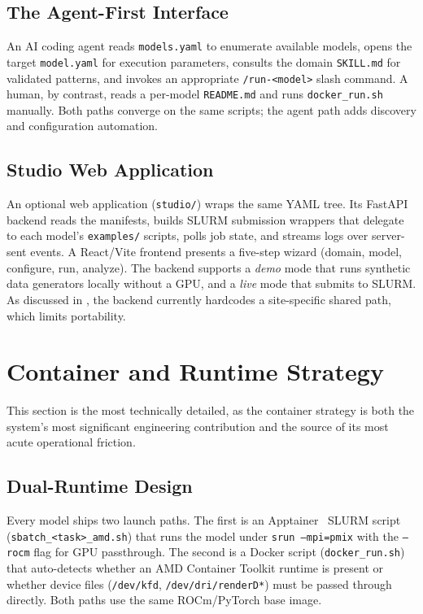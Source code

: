 \documentclass[11pt]{article}
\newcommand{\code}[1]{\texttt{#1}}
\newcommand{\file}[1]{\texttt{\small #1}}
\begin{document}
\subsection{The Agent-First Interface}
An AI coding agent reads \file{models.yaml} to enumerate available models, opens
the target \file{model.yaml} for execution parameters, consults the domain
\file{SKILL.md} for validated patterns, and invokes an appropriate \code{/run-<model>}
slash command. A human, by contrast, reads a per-model \file{README.md} and runs
\file{docker\_run.sh} manually. Both paths converge on the same scripts; the agent
path adds discovery and configuration automation.

\subsection{Studio Web Application}
An optional web application (\file{studio/}) wraps the same YAML tree. Its FastAPI
backend reads the manifests, builds SLURM submission wrappers that delegate to each
model's \file{examples/} scripts, polls job state, and streams logs over
server-sent events. A React/Vite frontend presents a five-step wizard (domain,
model, configure, run, analyze). The backend supports a \emph{demo} mode that runs
synthetic data generators locally without a GPU, and a \emph{live} mode that submits
to SLURM. As discussed in , the backend currently hardcodes a
site-specific shared path, which limits portability.

\section{Container and Runtime Strategy}
\label{sec:container}

This section is the most technically detailed, as the container strategy is both
the system's most significant engineering contribution and the source of its most
acute operational friction.

\subsection{Dual-Runtime Design}
Every model ships two launch paths. The first is an Apptainer~\cite{apptainer2021,
kurtzer2017singularity} SLURM script (\file{sbatch\_<task>\_amd.sh}) that runs the
model under \code{srun --mpi=pmix} with the \code{--rocm} flag for GPU passthrough.
The second is a Docker script (\file{docker\_run.sh}) that auto-detects whether an
AMD Container Toolkit runtime is present or whether device files
(\code{/dev/kfd}, \code{/dev/dri/renderD*}) must be passed through directly. Both
paths use the same ROCm/PyTorch base image.
\end{document}
